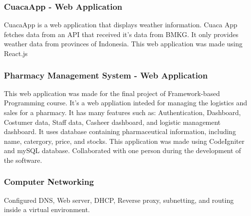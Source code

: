 \documentclass{article}
\begin{document}
\subsubsection{CuacaApp - Web Application}
CuacaApp is a web application that displays weather information. Cuaca App fetches data from an API that received it's data from BMKG. It only provides weather data from provinces of Indonesia. This web application was made using React.js  

\subsubsection{Pharmacy Management System - Web Application}
This web application was made for the final project of Framework-based Programming course. It's a web appliation inteded for managing the logistics and sales for a pharmacy. It has many features such as: Authentication, Dashboard, Costumer data, Staff data, Casheer dashboard, and logistic management dashboard. It uses database containing pharmaceutical information, including name, catergory, price, and stocks. This application was made using CodeIgniter and mySQL database. Collaborated with one person during the development of the software. 

\subsubsection{Computer Networking}
Configured DNS, Web server, DHCP, Reverse proxy, subnetting, and routing inside a virtual environment.
\end{document}
